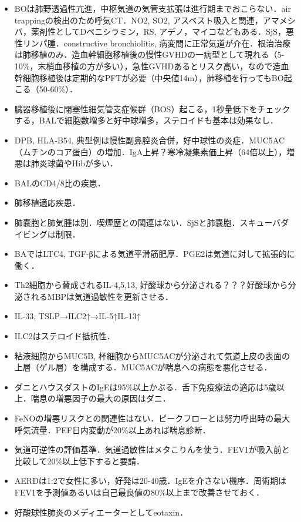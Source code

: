 \begin{itemize}
\item BOは肺野透過性亢進，中枢気道の気管支拡張は進行期までおこらない．air trappingの検出のため呼気CT．NO2, SO2, アスベスト吸入と関連，アマメシバ，薬剤性としてDペニシラミン，RS, アデノ，マイコなどもある．SjS，悪性リンパ腫．constructive bronchiolitis, 病変間に正常気道が介在．根治治療は肺移植のみ．造血幹細胞移植後の慢性GVHDの一病型として現れる（5-10\%，末梢血移植の方が多い），急性GVHDあるとリスク高い，なので造血幹細胞移植後は定期的なPFTが必要（中央値14m），肺移植を行ってもBO起こる（50-60\%）．
\item 臓器移植後に閉塞性細気管支症候群（BOS）起こる，1秒量低下をチェックする，BALで細胞数増多と好中球増多，ステロイドも基本は効果なし．

\item DPB, HLA-B54, 典型例は慢性副鼻腔炎合併，好中球性の炎症．MUC5AC（ムチンのコア蛋白）の増加．IgA上昇？寒冷凝集素価上昇（64倍以上），増悪は肺炎球菌やHibが多い．

\item BALのCD4/8比の疾患．
\item 肺移植適応疾患．
\item 肺嚢胞と肺気腫は別．喫煙歴との関連はない．SjSと肺嚢胞．スキューバダイビングは制限．

\item BAではLTC4, TGF-βによる気道平滑筋肥厚．PGE2は気道に対して拡張的に働く．
\item Th2細胞から賛成されるIL-4,5,13, 好酸球から分泌される？？？好酸球から分泌されるMBPは気道過敏性を更新させる．
\item IL-33, TSLP→ILC2↑→IL-5↑IL-13↑
\item ILC2はステロイド抵抗性．
\item 粘液細胞からMUC5B, 杯細胞からMUC5ACが分泌されて気道上皮の表面の上層（ゲル層）を構成する．MUC5ACが喘息への病態を悪化させる．
\item ダニとハウスダストのIgEは95\%以上かぶる．舌下免疫療法の適応は5歳以上．喘息の増悪因子の最大の原因はダニ．
\item FeNOの増悪リスクとの関連性はない．ピークフローとは努力呼出時の最大呼気流量．PEF日内変動が20\%以上あれば喘息診断．
\item 気道可逆性の評価基準．気道過敏性はメタこりんを使う．FEV1が吸入前と比較して20\%以上低下すると要請．

\item AERDは1:2で女性に多い，好発は20-40歳．IgEを介さない機序．周術期はFEV1を予測値あるいは自己最良値の80\%以上まで改善させておく．

\item 好酸球性肺炎のメディエーターとしてeotaxin．


\end{itemize}
